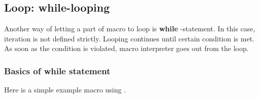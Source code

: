 \subsection{Loop: while-looping}

Another way of letting a part of macro to loop is \textbf{while} -statement. In this case, iteration is not defined strictly. Looping continues until certain condition is met. As soon as the condition is violated, macro interpreter goes out from the loop.

\subsubsection{Basics of while statement}
Here is a simple example macro using .
